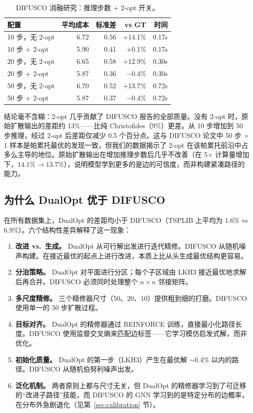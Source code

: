 \documentclass[11pt,a4paper]{ctexart}
\begin{document}
\begin{table}[H]
\centering
\small
\caption{DIFUSCO 消融研究：推理步数 + 2-opt 开关。}
\begin{tabular}{@{}lrrrr@{}}
\toprule
配置 & 平均成本 & 标准差 & vs GT & 时间 \\
\midrule
10 步，无 2-opt & 6.72 & 0.56 & +14.1\% & 0.17s \\
10 步 + 2-opt & 5.90 & 0.41 & +0.1\% & 0.17s \\
20 步，无 2-opt & 6.65 & 0.58 & +12.9\% & 0.30s \\
20 步 + 2-opt & 5.87 & 0.36 & $-$0.4\% & 0.30s \\
50 步，无 2-opt & 6.70 & 0.52 & +13.7\% & 0.72s \\
50 步 + 2-opt & 5.87 & 0.37 & $-$0.4\% & 0.72s \\
\bottomrule
\end{tabular}
\end{table}

结论毫不含糊：2-opt 几乎贡献了 DIFUSCO 报告的全部质量。没有 2-opt 时，原始扩散输出的差距约 13\%——比纯 Christofides（9\%）更差。从 10 步增加到 50 步推理，经过 2-opt 后差距仅减少 0.5 个百分点。这与 DIFUSCO 论文中 50 步 $\times$ 1 样本是帕累托最优的发现一致，但我们的数据揭示了 2-opt 在该帕累托前沿中占多么主导的地位。原始扩散输出在增加推理步数后几乎不改善（在 5$\times$ 计算量增加下，$14.1\% \rightarrow 13.7\%$），说明模型学到更多的是边的可信度，而非构建紧凑路径的能力。

\subsection{为什么 DualOpt 优于 DIFUSCO}

在所有数据集上，DualOpt 的差距均小于 DIFUSCO（TSPLIB 上平均为 1.6\% vs 6.9\%）。六个结构性差异解释了这一现象：

\begin{enumerate}[nosep]
\item \textbf{改进 vs.\ 生成。} DualOpt 从可行解出发进行迭代精修。DIFUSCO 从随机噪声构建。在接近最优的起点上进行改进，本质上比从头生成最优结构更容易。
\item \textbf{分治策略。} DualOpt 对平面进行分区；每个子区域由 LKH3 接近最优地求解后再合并。DIFUSCO 必须同时处理整个 $n \times n$ 邻接矩阵。
\item \textbf{多尺度精修。} 三个精修器尺寸（50、20、10）提供粗到细的打磨。DIFUSCO 使用单一的 50 步扩散过程。
\item \textbf{目标对齐。} DualOpt 的精修器通过 REINFORCE 训练，直接最小化路径长度。DIFUSCO 使用监督交叉熵来匹配边标签——它学习模仿启发式解，而非优化。
\item \textbf{初始化质量。} DualOpt 的第一步（LKH3）产生在最优解 $\sim$0.4\% 以内的路径。DIFUSCO 从随机伯努利噪声出发。
\item \textbf{泛化机制。} 两者原则上都与尺寸无关，但 DualOpt 的精修器学习到了可迁移的``改进子路径''技能，而 DIFUSCO 的 GNN 学习到的是特定分布的边概率，在分布外急剧退化（见第~\ref{sec:calibration} 节）。
\end{enumerate}
\end{document}
